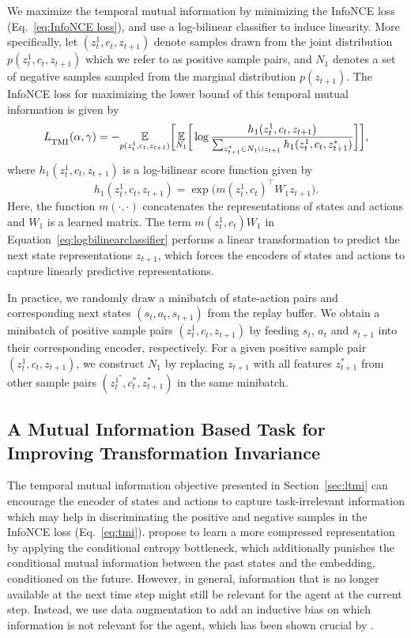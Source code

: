 \documentclass[a4paper,12pt]{article}
\begin{document}
We maximize the temporal mutual information by minimizing the InfoNCE loss (Eq.~\ref{eq:InfoNCE loss}), and use a log-bilinear classifier to induce linearity.
More specifically, let $(z_t^1, c_t, z_{t+1})$ denote samples drawn from the joint distribution $p(z_t^1, c_t, z_{t+1})$ which we refer to as positive sample pairs, and $N_1$ denotes a set of negative samples sampled from the marginal distribution $p(z_{t+1})$. The InfoNCE loss for maximizing the lower bound of this temporal mutual information is given by
\begin{equation}
    \label{eq:tmi}
    L_{\textsubscript{TMI}}(\alpha, \gamma) = - \underset{p(z_t^1, c_t, z_{t+1})}{\mathbb{E}} \bigg[ \underset{N_1}{\mathbb{E}}\bigg[\log\frac{h_1(z_t^1, c_t, z_{t+1})}{\sum_{z_{t+1}^* \in N_1 \cup z_{t+1}}h_1(z_t^1, c_t, z_{t+1}^*)}\bigg] \bigg],
\end{equation}
where $h_1(z_t^1, c_t, z_{t+1})$ is a log-bilinear score function given by 
\begin{equation}
    \label{eq:logbilinearclassifier}
    h_1(z_t^1, c_t, z_{t+1}) = \exp \big(m(z_t^1, c_t)^\top W_1 z_{t+1} \big).
\end{equation}
Here, the function $m(\cdot,\cdot)$ concatenates the representations of states and actions and $W_1$ is a learned matrix. The term $m(z_t^1, c_t)W_1$ in Equation~\ref{eq:logbilinearclassifier} performs a linear transformation to predict the next state representations $z_{t+1}$, which forces the encoders of states and actions to capture linearly predictive representations.

In practice, we randomly draw a minibatch of state-action pairs and corresponding next states $(s_t, a_t, s_{t+1})$ from the replay buffer. We obtain a minibatch of positive sample pairs $(z_t^1, c_t, z_{t+1})$ by feeding $s_t$, $a_t$ and $s_{t+1}$ into their corresponding encoder, respectively. For a given positive sample pair $(z_t^1, c_t, z_{t+1})$, we construct $N_1$ by replacing $z_{t+1}$ with all features $z_{t+1}^*$ from other sample pairs $(z_t^{1^*}, c_t^*, z_{t+1}^*)$ in the same minibatch.

\subsection{A Mutual Information Based Task for Improving Transformation Invariance}
The temporal mutual information objective presented in Section~\ref{sec:ltmi} can encourage the encoder of states and actions to capture task-irrelevant information which may help in discriminating the positive and negative samples in the InfoNCE loss (Eq.~\ref{eq:tmi}). \citet{lee2020predictive} propose to learn a more compressed representation by applying the conditional entropy bottleneck, which additionally punishes the conditional mutual information between the past states and the embedding, conditioned on the future. However, in general, information that is no longer available at the next time step might still be relevant for the agent at the current step. Instead, we use data augmentation to add an inductive bias on which information is not relevant for the agent, which has been shown crucial by \citet{yarats2021image}. 
\end{document}
